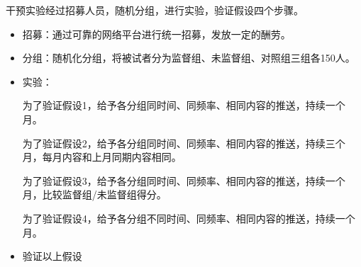 干预实验经过招募人员，随机分组，进行实验，验证假设四个步骤。
\begin{itemize}
    \item 招募：通过可靠的网络平台进行统一招募，发放一定的酬劳。
    \item 分组：随机化分组，将被试者分为监督组、未监督组、对照组三组各150人。
    \item 实验：
    
    为了验证假设1，给予各分组同时间、同频率、相同内容的推送，持续一个月。
    
        为了验证假设2，给予各分组同时间、同频率、相同内容的推送，持续三个月，每月内容和上月同期内容相同。
        
         为了验证假设3，给予各分组同时间、同频率、相同内容的推送，持续一个月，比较监督组/未监督组得分。    
         
         为了验证假设4，给予各分组不同时间、同频率、相同内容的推送，持续一个月。
        \item 验证以上假设
\end{itemize}


